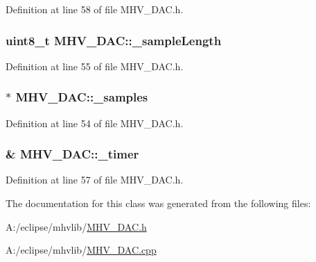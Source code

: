 Definition at line 58 of file M\-H\-V\-\_\-\-D\-A\-C.\-h.

\hypertarget{class_m_h_v___d_a_c_ab767970ffc3e4a37f0b5a682056c36f1}{
\subsubsection[{\-\_\-sample\-Length}]{\setlength{\rightskip}{0pt plus 5cm}uint8\-\_\-t M\-H\-V\-\_\-\-D\-A\-C\-::\-\_\-sample\-Length\hspace{0.3cm}{\ttfamily [protected]}}}\label{class_m_h_v___d_a_c_ab767970ffc3e4a37f0b5a682056c36f1}


Definition at line 55 of file M\-H\-V\-\_\-\-D\-A\-C.\-h.

\hypertarget{class_m_h_v___d_a_c_ab0630ebba308aca7ff4abccd0afcbb62}{
\subsubsection[{\-\_\-samples}]{$\ast$ M\-H\-V\-\_\-\-D\-A\-C\-::\-\_\-samples\hspace{0.3cm}{\ttfamily [protected]}}}\label{class_m_h_v___d_a_c_ab0630ebba308aca7ff4abccd0afcbb62}


Definition at line 54 of file M\-H\-V\-\_\-\-D\-A\-C.\-h.

\hypertarget{class_m_h_v___d_a_c_a84c55ff294197f30f2d75e58e4e3ad16}{
\subsubsection[{\-\_\-timer}]{\& M\-H\-V\-\_\-\-D\-A\-C\-::\-\_\-timer\hspace{0.3cm}{\ttfamily [protected]}}}\label{class_m_h_v___d_a_c_a84c55ff294197f30f2d75e58e4e3ad16}


Definition at line 57 of file M\-H\-V\-\_\-\-D\-A\-C.\-h.



The documentation for this class was generated from the following files\-:\begin{DoxyCompactItemize}
\item 
A\-:/eclipse/mhvlib/\hyperlink{_m_h_v___d_a_c_8h}{M\-H\-V\-\_\-\-D\-A\-C.\-h}\item 
A\-:/eclipse/mhvlib/\hyperlink{_m_h_v___d_a_c_8cpp}{M\-H\-V\-\_\-\-D\-A\-C.\-cpp}\end{DoxyCompactItemize}
